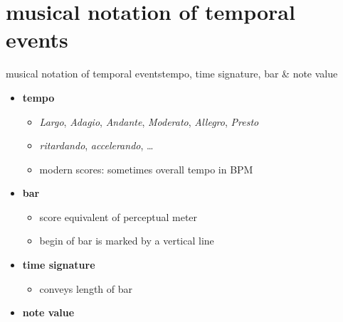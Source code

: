     \section[musical]{musical notation of temporal events}
        \begin{frame}{musical notation of temporal events}{tempo, time signature, bar \& note value}
            \begin{itemize}
                \item	\textbf{tempo}
                    \begin{itemize}
                        \item	\textsl{Largo}, \textsl{Adagio}, \textsl{Andante}, \textsl{Moderato}, \textsl{Allegro}, \textsl{Presto}
                        \item	\textsl{ritardando}, \textsl{accelerando}, \ldots
                        \item	modern scores: sometimes overall tempo in \unit{BPM}
                    \end{itemize}
                \smallskip
                \item<1->	\textbf{bar}
                    \begin{itemize}
                        \item	score equivalent of perceptual meter
                        \item	begin of bar is marked by a vertical line
                    \end{itemize}
                \smallskip
                \item<1->	\textbf{time signature}
                    \begin{itemize}
                        \item	conveys length of bar
                    \end{itemize}
                \smallskip
                \item<1->	\textbf{note value}
            \end{itemize}
        \end{frame}
    
